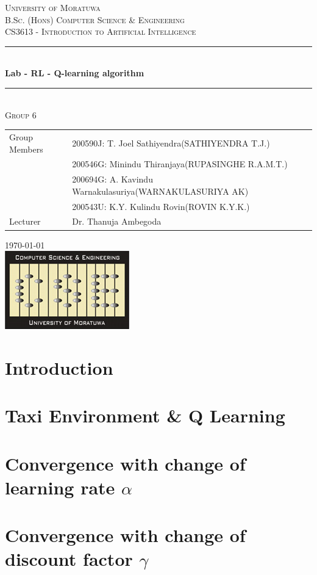 \documentclass[11pt]{article}
\begin{document}
\begin{titlepage}

\newcommand{\HRule}{\rule{\linewidth}{0.5mm}} 

\center 

\textsc{\LARGE University of Moratuwa}\\[1.5cm] 

\textsc{\Large  B.Sc. (Hons) Computer Science \& Engineering}\\[0.5cm] 
\textsc{\large CS3613 - Introduction to Artificial Intelligence}\\[0.5cm] 

\HRule \\[0.4cm]
{ \huge \bfseries Lab - RL - Q-learning algorithm}\\[0.4cm] 

\HRule \\[1.5cm]

\textsc{\LARGE Group 6}\\[1.5cm] %
\noindent\begin{tabular}{@{}ll}
    Group Members & 200590J: T. Joel Sathiyendra(SATHIYENDRA T.J.)\\
    & 200546G: Minindu Thiranjaya(RUPASINGHE R.A.M.T.)  \\
    & 200694G: A. Kavindu Warnakulasuriya(WARNAKULASURIYA AK) \\
    & 200543U: K.Y. Kulindu Rovin(ROVIN K.Y.K.)  \\[.5cm]
     Lecturer &  Dr. Thanuja Ambegoda\\[.5cm]
\end{tabular}

{\large \today}\\[2cm] 

\includegraphics{CSE_logo.png}\\[1cm] 

\vfill %

\end{titlepage}

\section*{Introduction}
\section*{Taxi Environment \& Q Learning}
\section*{Convergence with change of learning rate $\alpha $}
\section*{Convergence with change of discount factor $\gamma $}
\end{document}

